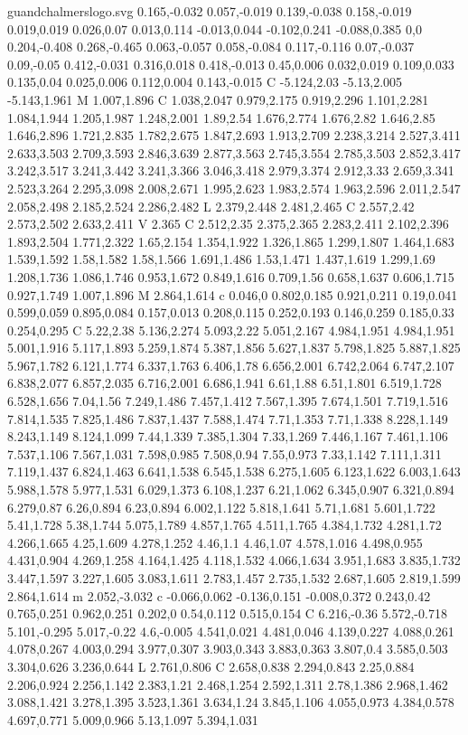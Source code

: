 \begin{filecontents}[noheader]{guandchalmerslogo.svg}
0.165,-0.032 0.057,-0.019 0.139,-0.038 0.158,-0.019 0.019,0.019 0.026,0.07 0.013,0.114 -0.013,0.044 -0.102,0.241 -0.088,0.385 0,0 0.204,-0.408 0.268,-0.465 0.063,-0.057 0.058,-0.084 0.117,-0.116 0.07,-0.037 0.09,-0.05 0.412,-0.031 0.316,0.018 0.418,-0.013 0.45,0.006 0.032,0.019 0.109,0.033 0.135,0.04 0.025,0.006 0.112,0.004 0.143,-0.015 C -5.124,2.03 -5.13,2.005 -5.143,1.961 M 1.007,1.896 C 1.038,2.047 0.979,2.175 0.919,2.296 1.101,2.281 1.084,1.944 1.205,1.987 1.248,2.001 1.89,2.54 1.676,2.774 1.676,2.82 1.646,2.85 1.646,2.896 1.721,2.835 1.782,2.675 1.847,2.693 1.913,2.709 2.238,3.214 2.527,3.411 2.633,3.503 2.709,3.593 2.846,3.639 2.877,3.563 2.745,3.554 2.785,3.503 2.852,3.417 3.242,3.517 3.241,3.442 3.241,3.366 3.046,3.418 2.979,3.374 2.912,3.33 2.659,3.341 2.523,3.264 2.295,3.098 2.008,2.671 1.995,2.623 1.983,2.574 1.963,2.596 2.011,2.547 2.058,2.498 2.185,2.524 2.286,2.482 L 2.379,2.448 2.481,2.465 C 2.557,2.42 2.573,2.502 2.633,2.411 V 2.365 C 2.512,2.35 2.375,2.365 2.283,2.411 2.102,2.396 1.893,2.504 1.771,2.322 1.65,2.154 1.354,1.922 1.326,1.865 1.299,1.807 1.464,1.683 1.539,1.592 1.58,1.582 1.58,1.566 1.691,1.486 1.53,1.471 1.437,1.619 1.299,1.69 1.208,1.736 1.086,1.746 0.953,1.672 0.849,1.616 0.709,1.56 0.658,1.637 0.606,1.715 0.927,1.749 1.007,1.896 M 2.864,1.614 c 0.046,0 0.802,0.185 0.921,0.211 0.19,0.041 0.599,0.059 0.895,0.084 0.157,0.013 0.208,0.115 0.252,0.193 0.146,0.259 0.185,0.33 0.254,0.295 C 5.22,2.38 5.136,2.274 5.093,2.22 5.051,2.167 4.984,1.951 4.984,1.951 5.001,1.916 5.117,1.893 5.259,1.874 5.387,1.856 5.627,1.837 5.798,1.825 5.887,1.825 5.967,1.782 6.121,1.774 6.337,1.763 6.406,1.78 6.656,2.001 6.742,2.064 6.747,2.107 6.838,2.077 6.857,2.035 6.716,2.001 6.686,1.941 6.61,1.88 6.51,1.801 6.519,1.728 6.528,1.656 7.04,1.56 7.249,1.486 7.457,1.412 7.567,1.395 7.674,1.501 7.719,1.516 7.814,1.535 7.825,1.486 7.837,1.437 7.588,1.474 7.71,1.353 7.71,1.338 8.228,1.149 8.243,1.149 8.124,1.099 7.44,1.339 7.385,1.304 7.33,1.269 7.446,1.167 7.461,1.106 7.537,1.106 7.567,1.031 7.598,0.985 7.508,0.94 7.55,0.973 7.33,1.142 7.111,1.311 7.119,1.437 6.824,1.463 6.641,1.538 6.545,1.538 6.275,1.605 6.123,1.622 6.003,1.643 5.988,1.578 5.977,1.531 6.029,1.373 6.108,1.237 6.21,1.062 6.345,0.907 6.321,0.894 6.279,0.87 6.26,0.894 6.23,0.894 6.002,1.122 5.818,1.641 5.71,1.681 5.601,1.722 5.41,1.728 5.38,1.744 5.075,1.789 4.857,1.765 4.511,1.765 4.384,1.732 4.281,1.72 4.266,1.665 4.25,1.609 4.278,1.252 4.46,1.1 4.46,1.07 4.578,1.016 4.498,0.955 4.431,0.904 4.269,1.258 4.164,1.425 4.118,1.532 4.066,1.634 3.951,1.683 3.835,1.732 3.447,1.597 3.227,1.605 3.083,1.611 2.783,1.457 2.735,1.532 2.687,1.605 2.819,1.599 2.864,1.614 m 2.052,-3.032 c -0.066,0.062 -0.136,0.151 -0.008,0.372 0.243,0.42 0.765,0.251 0.962,0.251 0.202,0 0.54,0.112 0.515,0.154 C 6.216,-0.36 5.572,-0.718 5.101,-0.295 5.017,-0.22 4.6,-0.005 4.541,0.021 4.481,0.046 4.139,0.227 4.088,0.261 4.078,0.267 4.003,0.294 3.977,0.307 3.903,0.343 3.883,0.363 3.807,0.4 3.585,0.503 3.304,0.626 3.236,0.644 L 2.761,0.806 C 2.658,0.838 2.294,0.843 2.25,0.884 2.206,0.924 2.256,1.142 2.383,1.21 2.468,1.254 2.592,1.311 2.78,1.386 2.968,1.462 3.088,1.421 3.278,1.395 3.523,1.361 3.634,1.24 3.845,1.106 4.055,0.973 4.384,0.578 4.697,0.771 5.009,0.966 5.13,1.097 5.394,1.031 
\end{filecontents}
